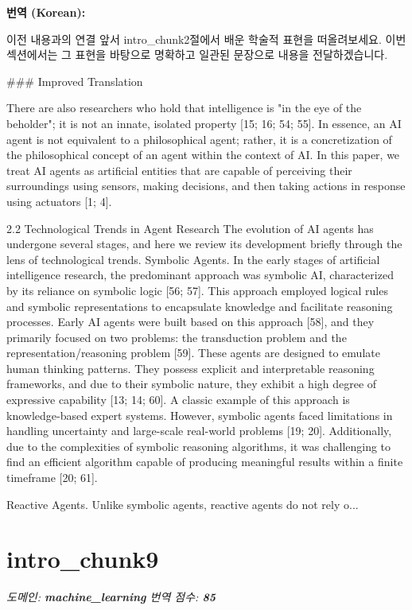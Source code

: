 \documentclass[12pt,a4paper]{article}
\begin{document}
\begin{mdframed}[style=ko]
\noindent\textbf{\small 번역 (Korean):}\\[2pt]
\begin{linkbox}{이전 내용과의 연결}
  앞서 intro_chunk2절에서 배운 학술적 표현을 떠올려보세요. 이번 섹션에서는 그 표현을 바탕으로 명확하고 일관된 문장으로 내용을 전달하겠습니다.
\end{linkbox}
### Improved Translation

There are also researchers who hold that intelligence is "in the eye of the beholder"; it is not an innate, isolated property [15; 16; 54; 55]. In essence, an AI agent is not equivalent to a philosophical agent; rather, it is a concretization of the philosophical concept of an agent within the context of AI. In this paper, we treat AI agents as artificial entities that are capable of perceiving their surroundings using sensors, making decisions, and then taking actions in response using actuators [1; 4].

2.2 Technological Trends in Agent Research
The evolution of AI agents has undergone several stages, and here we review its development briefly through the lens of technological trends. Symbolic Agents. In the early stages of artificial intelligence research, the predominant approach was symbolic AI, characterized by its reliance on symbolic logic [56; 57]. This approach employed logical rules and symbolic representations to encapsulate knowledge and facilitate reasoning processes. Early AI agents were built based on this approach [58], and they primarily focused on two problems: the transduction problem and the representation/reasoning problem [59]. These agents are designed to emulate human thinking patterns. They possess explicit and interpretable reasoning frameworks, and due to their symbolic nature, they exhibit a high degree of expressive capability [13; 14; 60]. A classic example of this approach is knowledge-based expert systems. However, symbolic agents faced limitations in handling uncertainty and large-scale real-world problems [19; 20]. Additionally, due to the complexities of symbolic reasoning algorithms, it was challenging to find an efficient algorithm capable of producing meaningful results within a finite timeframe [20; 61].

Reactive Agents. Unlike symbolic agents, reactive agents do not rely o...
\end{mdframed}
\vspace{1em}

\section{intro\_chunk9}
\noindent\textit{\small 도메인: \textbf{machine\_learning} \quad 번역 점수: \textbf{\color{green!60!black}85}}
\vspace{0.5em}
\end{document}
